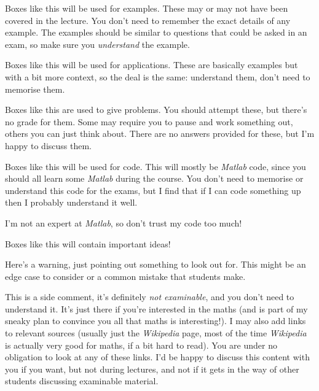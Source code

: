 \documentclass[fleqn]{LectureClass/LectureClass}
\begin{document}
    \begin{exm}{}{}
        Boxes like this will be used for examples.
        These may or may not have been covered in the lecture.
        You don't need to remember the exact details of any example.
        The examples should be similar to questions that could be asked in an exam, so make sure you \emph{understand} the example.
    \end{exm}
    
    \begin{app}{}{}
        Boxes like this will be used for applications.
        These are basically examples but with a bit more context, so the deal is the same: understand them, don't need to memorise them.
    \end{app}
    
    \begin{problem}{}{}
        Boxes like this are used to give problems.
        You should attempt these, but there's no grade for them.
        Some may require you to pause and work something out, others you can just think about.
        There are no answers provided for these, but I'm happy to discuss them.
    \end{problem}
    
    \begin{cde}{}{}
        Boxes like this will be used for code.
        This will mostly be \textit{Matlab} code, since you should all learn some \textit{Matlab} during the course.
        You don't need to memorise or understand this code for the exams, but I find that if I can code something up then I probably understand it well.
        
        I'm not an expert at \textit{Matlab}, so don't trust my code too much!
    \end{cde}
    
    \begin{important}
        Boxes like this will contain important ideas!
    \end{important}
    
    \begin{wrn}
        Here's a warning, just pointing out something to look out for.
        This might be an edge case to consider or a common mistake that students make.
    \end{wrn}
    
    \begin{remark}{}{}
        This is a side comment, it's definitely \emph{not examinable}, and you don't need to understand it.
        It's just there if you're interested in the maths (and is part of my sneaky plan to convince you all that maths is interesting!).
        I may also add links to relevant sources (usually just the \textit{Wikipedia} page, most of the time \textit{Wikipedia} is actually very good for maths, if a bit hard to read).
        You are under no obligation to look at any of these links.
        I'd be happy to discuss this content with you if you want, but not during lectures, and not if it gets in the way of other students discussing examinable material.
    \end{remark}
    
\end{document}
